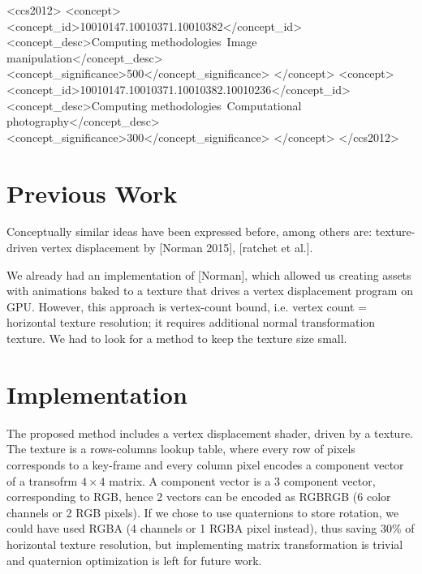 \documentclass{acmsiggraph}
\begin{document}
%
%
\begin{CCSXML}
<ccs2012>
<concept>
<concept_id>10010147.10010371.10010382</concept_id>
<concept_desc>Computing methodologies~Image manipulation</concept_desc>
<concept_significance>500</concept_significance>
</concept>
<concept>
<concept_id>10010147.10010371.10010382.10010236</concept_id>
<concept_desc>Computing methodologies~Computational photography</concept_desc>
<concept_significance>300</concept_significance>
</concept>
</ccs2012>
\end{CCSXML}


%
%


\keywordlist

\conceptlist





\section{Previous Work}

Conceptually similar ideas have been expressed before, among others are:
texture-driven vertex displacement by [Norman 2015], [ratchet et al.].

We already had an implementation of [Norman], which allowed us creating assets with animations baked to a texture that drives a vertex displacement program on GPU.
However, this approach is vertex-count bound, i.e. vertex count = horizontal texture resolution; it requires additional normal transformation texture. We had to look for a method to keep the texture size small. 

\section{Implementation}

The proposed method includes a vertex displacement shader, driven by a texture.  The texture is a rows-columns lookup table, where every row of pixels corresponds to a key-frame and every column pixel encodes a component vector of a transofrm \(4 \times 4\) matrix. A component vector is a 3 component vector, corresponding to RGB, hence 2 vectors can be encoded as RGBRGB (6 color channels or 2 RGB pixels).  If we chose to use quaternions to store rotation, we could have used RGBA (4 channels or 1 RGBA pixel instead), thus saving 30\% of horizontal texture resolution, but implementing matrix transformation is trivial and quaternion optimization is left for future work.
\end{document}
